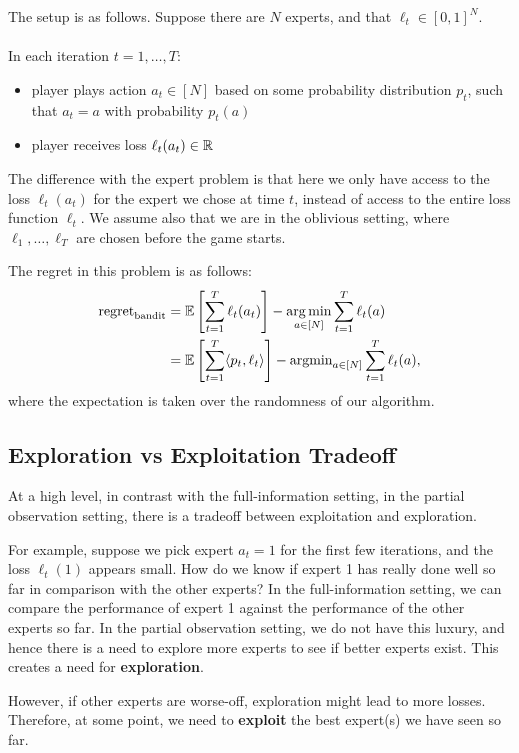 \documentclass[11pt]{article}
\begin{document}
The setup is as follows. Suppose there are $N$ experts, and that $\ell_t \in [0,1]^N$.
\paragraph{}
In each iteration $t = 1,\dots, T$:
\begin{itemize}
    \item player plays action $a_t \in [N]$ based on some probability distribution $p_t$, such that $a_t = a$ with probability $p_t(a)$
    \item player receives loss $\ell_t(a_t) \in \mathbb{R}$
\end{itemize}
The difference with the expert problem is that here we only have access to the loss $\ell_t(a_t)$ for the expert we chose at time $t$, instead of access to the entire loss function $\ell_t$. We assume also that we are in the oblivious setting, where $\ell_1,\dots,\ell_T$ are chosen before the game starts.

The regret in this problem is as follows:
\begin{align*}
    \text{regret}_{\text{bandit}} &= \mathbb{E}\left[ \sum_{t=1}^T \ell_t(a_t) \right] - \operatorname*{arg\,min}_{a \in [N]} \sum_{t=1}^T \ell_t(a) \\
    &=  \mathbb{E}\left[ \sum_{t=1}^T \langle p_t, \ell_t \rangle \right] - \text{argmin}_{a \in [N]} \sum_{t=1}^T \ell_t(a),
\end{align*}
where the expectation is taken over the randomness of our algorithm. 

\subsection{Exploration vs Exploitation Tradeoff}
At a high level, in contrast with the full-information setting, in the partial observation setting, there is a tradeoff between exploitation and exploration.

For example, suppose we pick expert $a_t = 1$ for the first few iterations, and the loss $\ell_t(1)$ appears small. How do we know if expert 1 has really done well so far in comparison with the other experts? In the full-information setting, we can compare the performance of expert 1 against the performance of the other experts so far. In the partial observation setting, we do not have this luxury, and hence there is a need to explore more experts to see if  better experts exist. This creates a need for \textbf{exploration}.

However, if other experts are worse-off, exploration might lead to more losses. Therefore, at some point, we need to \textbf{exploit} the best expert(s) we have seen so far. 
\end{document}
